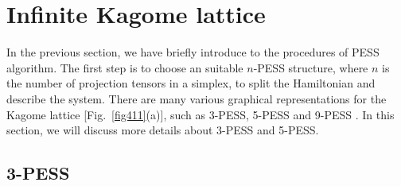 \section{Infinite Kagome lattice}
\label{kagome}
In the previous section, we have briefly introduce to the procedures of PESS algorithm. The first step is to  choose an suitable $n$-PESS structure, where $n$ is the number of projection tensors in a simplex, to split the Hamiltonian and describe the system. There are many various graphical representations for the Kagome lattice [Fig.~\ref{fig411}(a)], such as 3-PESS, 5-PESS and 9-PESS \cite{PhysRevX.4.011025}. In this section, we will discuss more details about 3-PESS and 5-PESS.

\subsection{3-PESS}

